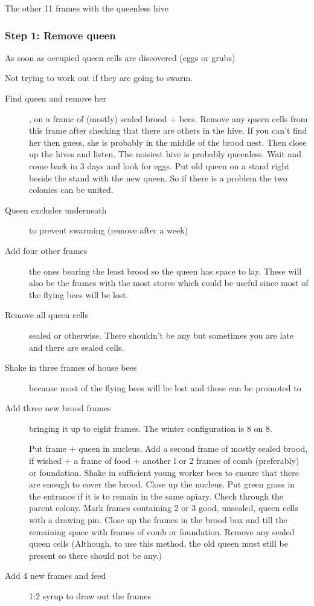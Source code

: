 The other 11 frames with the queenless hive

\subsubsection*{Step 1: Remove queen}

As soon as occupied queen cells are discovered (eggs or grubs)

Not trying to work out if they are going to swarm.

\begin{description}
  \item[Find queen and remove her], on a frame of (mostly) sealed brood + bees. Remove any queen cells from this frame after checking that there are others in the hive.
  If you can't find her  then guess, she is probably in the middle of the brood nest.
  Then close up the hives and listen.  The noisiest hive is probably queenless.
  Wait and come back in 3 days and look for eggs.
  Put old queen on a stand right beside the stand with the new queen.
  So if there is a problem the two colonies can be united.
  \item[Queen excluder underneath] to prevent swarming (remove after a week)
  \item[Add four other frames] the ones bearing the least brood so the queen has space to lay.
  These will also be the frames with the most stores which could be useful since most of the flying bees will be lost.
  \item[Remove all queen cells] sealed or otherwise.  There shouldn't be any but sometimes you are late and there are sealed cells.
  \item[Shake in three frames of house bees] because most of the flying bees will be lost and these can be promoted to 
  \item[Add three new brood frames] bringing it up to eight frames.  The winter configuration is 8 on 8.
  
  
Put frame + queen in nucleus.
Add a second frame of mostly sealed brood, if wished + a frame of food + another l or 2
frames of comb (preferably) or foundation.
Shake in sufficient young worker bees to ensure that there are enough to cover the brood.
Close up the nucleus. Put green grass in the entrance if it is to remain in the same apiary.
Check through the parent colony.  Mark frames containing 2 or 3 good, unsealed, queen cells with a drawing pin.
Close up the frames in the brood box and till the remaining space with frames of comb or foundation.
  Remove any sealed queen cells (Although, to use this method, the old queen must still be present so there should not be any.)
  \item[Add 4 new frames and feed] 1:2 syrup to draw out the frames
\end{description}

